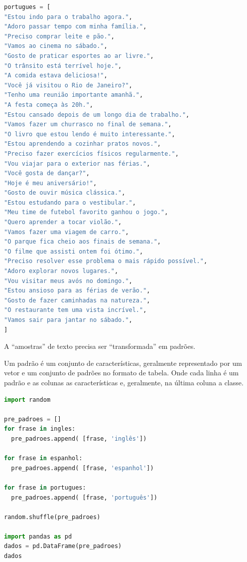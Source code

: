 \begin{lstlisting}[language=Python, style=input]
portugues = [
"Estou indo para o trabalho agora.",
"Adoro passar tempo com minha família.",
"Preciso comprar leite e pão.",
"Vamos ao cinema no sábado.",
"Gosto de praticar esportes ao ar livre.",
"O trânsito está terrível hoje.",
"A comida estava deliciosa!",
"Você já visitou o Rio de Janeiro?",
"Tenho uma reunião importante amanhã.",
"A festa começa às 20h.",
"Estou cansado depois de um longo dia de trabalho.",
"Vamos fazer um churrasco no final de semana.",
"O livro que estou lendo é muito interessante.",
"Estou aprendendo a cozinhar pratos novos.",
"Preciso fazer exercícios físicos regularmente.",
"Vou viajar para o exterior nas férias.",
"Você gosta de dançar?",
"Hoje é meu aniversário!",
"Gosto de ouvir música clássica.",
"Estou estudando para o vestibular.",
"Meu time de futebol favorito ganhou o jogo.",
"Quero aprender a tocar violão.",
"Vamos fazer uma viagem de carro.",
"O parque fica cheio aos finais de semana.",
"O filme que assisti ontem foi ótimo.",
"Preciso resolver esse problema o mais rápido possível.",
"Adoro explorar novos lugares.",
"Vou visitar meus avós no domingo.",
"Estou ansioso para as férias de verão.",
"Gosto de fazer caminhadas na natureza.",
"O restaurante tem uma vista incrível.",
"Vamos sair para jantar no sábado.",
]
\end{lstlisting}

A ``amostras'' de texto precisa ser ``transformada'' em padrões.

Um padrão é um conjunto de características, geralmente representado por um vetor e um conjunto de padrões no formato de tabela. Onde cada linha é um padrão e as colunas as características e, geralmente, na última coluna a classe.


\begin{lstlisting}[language=Python, style=input]
import random

pre_padroes = []
for frase in ingles:
  pre_padroes.append( [frase, 'inglês'])

for frase in espanhol:
  pre_padroes.append( [frase, 'espanhol'])

for frase in portugues:
  pre_padroes.append( [frase, 'português'])

random.shuffle(pre_padroes)

import pandas as pd
dados = pd.DataFrame(pre_padroes)
dados
\end{lstlisting}

